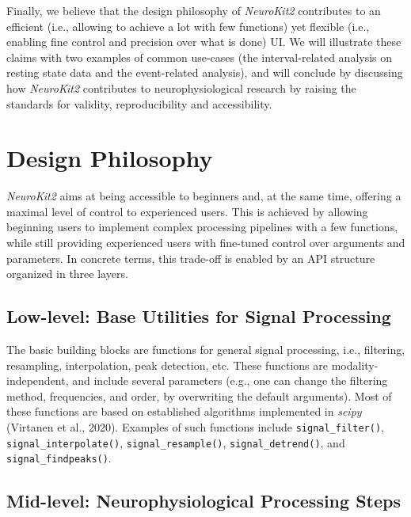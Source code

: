 \documentclass[
  english,
  man,floatsintext]{apa6}
\begin{document}
Finally, we believe that the design philosophy of \emph{NeuroKit2} contributes to an efficient (i.e., allowing to achieve a lot with few functions) yet flexible (i.e., enabling fine control and precision over what is done) UI. We will illustrate these claims with two examples of common use-cases (the interval-related analysis on resting state data and the event-related analysis), and will conclude by discussing how \emph{NeuroKit2} contributes to neurophysiological research by raising the standards for validity, reproducibility and accessibility.

\hypertarget{design-philosophy}{%
\section{Design Philosophy}\label{design-philosophy}}

\emph{NeuroKit2} aims at being accessible to beginners and, at the same time, offering a maximal level of control to experienced users. This is achieved by allowing beginning users to implement complex processing pipelines with a few functions, while still providing experienced users with fine-tuned control over arguments and parameters. In concrete terms, this trade-off is enabled by an API structure organized in three layers.

\hypertarget{low-level-base-utilities-for-signal-processing}{%
\subsection{Low-level: Base Utilities for Signal Processing}\label{low-level-base-utilities-for-signal-processing}}

The basic building blocks are functions for general signal processing, i.e., filtering, resampling, interpolation, peak detection, etc. These functions are modality-independent, and include several parameters (e.g., one can change the filtering method, frequencies, and order, by overwriting the default arguments). Most of these functions are based on established algorithms implemented in \emph{scipy} (Virtanen et al., 2020). Examples of such functions include \texttt{signal\_filter()}, \texttt{signal\_interpolate()}, \texttt{signal\_resample()}, \texttt{signal\_detrend()}, and \texttt{signal\_findpeaks()}.

\hypertarget{mid-level-neurophysiological-processing-steps}{%
\subsection{Mid-level: Neurophysiological Processing Steps}\label{mid-level-neurophysiological-processing-steps}}
\end{document}
